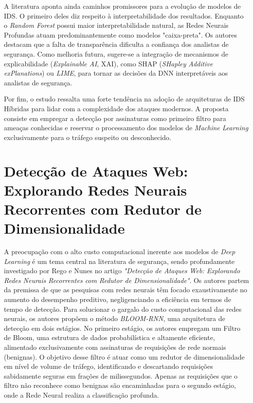A literatura aponta ainda caminhos promissores para a evolução de modelos de IDS. O primeiro deles diz respeito à interpretabilidade dos resultados. Enquanto o \textit{Random Forest} possui maior interpretabilidade natural, as Redes Neurais Profundas atuam predominantemente como modelos "caixa-preta". Os autores destacam que a falta de transparência dificulta a confiança dos analistas de segurança. Como melhoria futura, sugere-se a integração de mecanismos de explicabilidade (\textit{Explainable AI}, XAI), como SHAP (\textit{SHapley Additive exPlanations}) ou \textit{LIME}, para tornar as decisões da DNN interpretáveis aos analistas de segurança.

Por fim, o estudo ressalta uma forte tendência na adoção de arquiteturas de IDS Híbridas para lidar com a complexidade dos ataques modernos. A proposta consiste em empregar a detecção por assinaturas como primeiro filtro para ameaças conhecidas e reservar o processamento dos modelos de \textit{Machine Learning} exclusivamente para o tráfego suspeito ou desconhecido.

\section{Detecção de Ataques Web: Explorando Redes Neurais Recorrentes com Redutor de Dimensionalidade}

A preocupação com o alto custo computacional inerente aos modelos de \textit{Deep Learning} é um tema central na literatura de segurança, sendo profundamente investigado por Rego e Nunes \cite{rego_nunes} no artigo \textit{"Detecção de Ataques Web: Explorando Redes Neurais Recorrentes com Redutor de Dimensionalidade"}. Os autores partem da premissa de que as pesquisas com redes neurais têm focado exaustivamente no aumento do desempenho preditivo, negligenciando a eficiência em termos de tempo de detecção. 
Para solucionar o gargalo do custo computacional das redes neurais, os autores propõem o método \textit{BLOOM-RNN}, uma arquitetura de detecção em dois estágios. No primeiro estágio, os autores empregam um Filtro de Bloom, uma estrutura de dados probabilística e altamente eficiente, alimentado exclusivamente com assinaturas de requisições de rede normais (benignas). O objetivo desse filtro é atuar como um redutor de dimensionalidade em nível de volume de tráfego, identificando e descartando requisições sabidamente seguras em frações de milissegundos. Apenas as requisições que o filtro não reconhece como benignas são encaminhadas para o segundo estágio, onde a Rede Neural realiza a classificação profunda.

